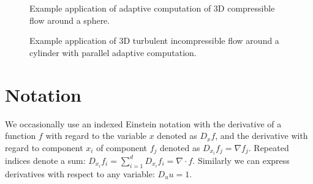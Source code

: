 \begin{figure}
\caption{Example application of adaptive computation of 3D compressible
flow around a sphere.}
\label{fig:compr3D}
\end{figure}

\begin{figure}
\caption{Example application of 3D turbulent incompressible flow around
a cylinder with parallel adaptive computation.}
\label{fig:parcyl3D}
\end{figure}

\label{chapter:implementation:unicorn}

\section{Notation}

We occasionally use an indexed Einstein notation with the derivative
of a function $f$ with regard to the variable $x$ denoted as $D_x f$,
and the derivative with regard to component $x_i$ of component $f_j$
denoted as $D_{x_i} f_j = \nabla f_j$. Repeated indices denote a sum:
$D_{x_i} f_i = \sum_{i=1}^d D_{x_i} f_i = \nabla \cdot f$. Similarly we
can express derivatives with respect to any variable: $D_u u = 1$.

